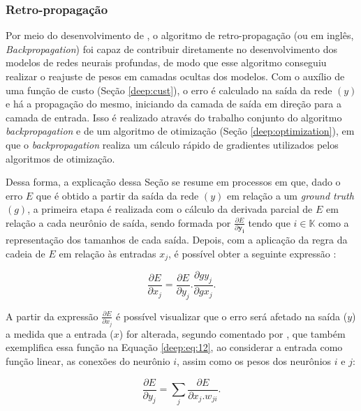 \subsubsection{Retro-propagação}
\label{deep:backprop}

\begin{sloppypar}
Por meio do desenvolvimento de \cite{rumelhart1986learning}, o algoritmo de retro-propagação (ou em inglês, \textit{Backpropagation}) foi capaz de contribuir diretamente no desenvolvimento dos modelos de redes neurais profundas, de modo que esse algoritmo conseguiu realizar o reajuste de pesos em camadas ocultas dos modelos. Com o auxílio de uma função de custo (Seção
\ref{deep:cust}), o erro é calculado na saída da rede $(y)$ e há a propagação do mesmo, iniciando da camada de saída em direção para a camada de entrada. Isso é realizado através do trabalho conjunto do algoritmo \textit{backpropagation} e de um algoritmo de otimização (Seção \ref{deep:optimization}), em que o \textit{backpropagation} realiza um cálculo rápido de gradientes utilizados pelos algoritmos de otimização.
\end{sloppypar}

Dessa forma, a explicação dessa Seção se resume em processos em que, dado o erro $E$ que é obtido a partir da saída da rede $(y)$ em relação a um \textit{ground truth} $(g)$, a primeira etapa é realizada com o cálculo da derivada parcial de $E$ em relação a cada neurônio de saída, sendo formada por $\frac{\partial E}{\partial \boldsymbol{y_i}}$ tendo que $i \in \mathbb{K}$ como a representação dos tamanhos de cada saída. Depois, com a aplicação da regra da cadeia de $E$ em relação às entradas $x_j$, é possível obter a seguinte expressão \citep{rumelhart1986learning}:

\begin{equation}
    \label{deep:eq:11}
    \frac{\partial E}{\partial x_j} = \frac{\partial E}{\partial y_j} . \frac{\partial g y_j}{\partial g x_j}.
\end{equation}

A partir da expressão $\frac{\partial E}{\partial x_j}$ é possível visualizar que o erro será afetado na saída ($y$) a medida que a entrada ($x$) for alterada, segundo comentado por \cite{rumelhart1986learning}, que também exemplifica essa função na Equação \ref{deep:eq:12}, ao considerar a entrada como função linear, as conexões do neurônio $i$, assim como os pesos dos neurônios $i$ e $j$:

\begin{equation}
    \label{deep:eq:12}
    \frac{\partial E}{\partial y_j} = \sum_j \frac{\partial E}{\partial x_j . w_{ji}}.
\end{equation}


